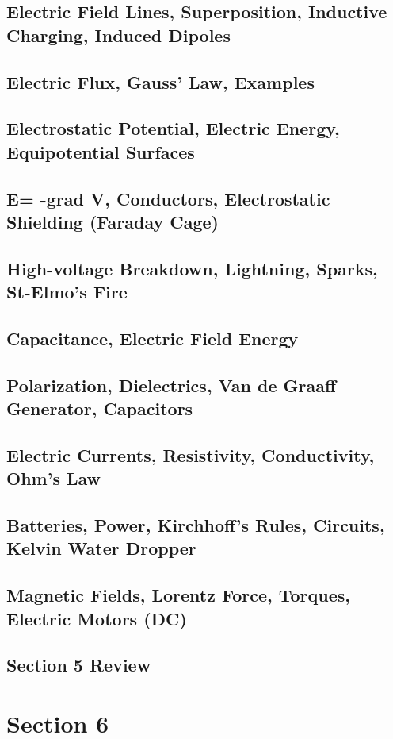 \documentclass[../introphysics.tex]{subfiles}
\begin{document}
\section{Electric Field Lines, Superposition, Inductive Charging, Induced Dipoles}
\section{Electric Flux, Gauss' Law, Examples}
\section{Electrostatic Potential, Electric Energy, Equipotential Surfaces}
\section{E= -grad V, Conductors, Electrostatic Shielding (Faraday Cage)}
\section{High-voltage Breakdown, Lightning, Sparks, St-Elmo's Fire}
\section{Capacitance, Electric Field Energy}
\section{Polarization, Dielectrics, Van de Graaff Generator, Capacitors}
\section{Electric Currents, Resistivity, Conductivity, Ohm's Law}
\section{Batteries, Power, Kirchhoff's Rules, Circuits, Kelvin Water Dropper}
\section{Magnetic Fields, Lorentz Force, Torques, Electric Motors (DC)}
\section{Section 5 Review}
\chapter{Section 6}
\end{document}
